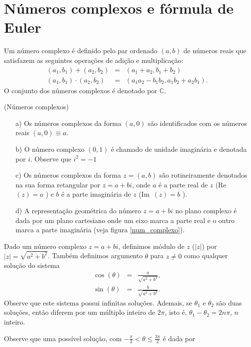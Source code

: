 \section{Números complexos e fórmula de Euler}
\begin{defn} Um número complexo é definido pelo par ordenado $(a,b)$ de números reais que satisfazem as seguintes operações de adição e multiplicação:
\begin{eqnarray*}
(a_1,b_1)+(a_2,b_2)&=&(a_1+a_2,b_1+b_2)\\
(a_1,b_1)\cdot(a_2,b_2)&=&(a_1a_2-b_1b_2,a_1b_2+a_2b_1).
\end{eqnarray*}
O conjunto dos números complexos é denotado por $\mathbb{C}$.
\end{defn}
\begin{obs}(Números complexos)
\begin{itemize} 
\item[a)] Os números complexos da forma $(a,0)$ são identificados com os números reais $(a,0)\equiv a$.
\item[b)] O número complexo $(0,1)$ é chamado de unidade imaginária e denotada por $i$. Observe que $i^2=-1$
\item[c)] Os números complexos da forma $z=(a,b)$ são rotineiramente denotados na sua forma retangular por $z=a+bi$, onde $a$ é a parte real de $z$ (Re\ \!$(z)=a$ ) e $b$ é a parte imaginária de $z$ (Im\ \!$(z)=b$ ).
\item[d)] A representação geométrica do número $z=a+bi$ no plano complexo é dada por um plano cartesiano onde um eixo marca a parte real e o outro marca a parte imaginária (veja figura \ref{num_complexo}).
\end{itemize}
\end{obs}
\begin{defn}Dado um número complexo $z=a+bi$, definimos módulo de $z$ ($|z|$) por $|z|=\sqrt{a^2+b^2}$. Também definimos argumento $\theta$ para $z\neq 0$ como qualquer  solução do sistema
\begin{eqnarray}
 \cos(\theta)&=&\frac{a}{\sqrt{a^2+b^2}},\\
 \sin(\theta)&=&\frac{b}{\sqrt{a^2+b^2}}.
\end{eqnarray}
Observe que este sistema possui infinitas soluções. Ademais, se $\theta_1$ e $\theta_2$ são duas soluções, então diferem por um múltiplo inteiro de $2\pi$, isto é, $\theta_1-\theta_2=2n\pi$, $n$ inteiro.
\end{defn}
Observe que uma possível solução, com $-\frac{\pi}{2}<\theta\leq \frac{3\pi}{2}$ é dada por
